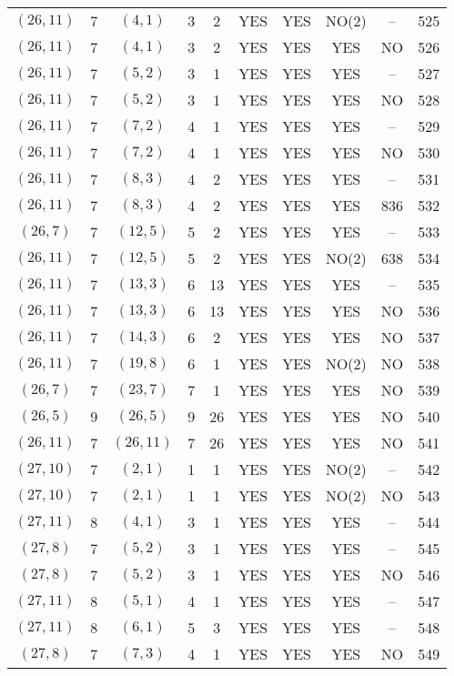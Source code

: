 \begin{longtable}{|c|c|c|c|c|c|c|c|c|c|}
$(26, 11)$ & 7 & $(4, 1)$ & 3 & 2 & YES & YES & NO(2) & -- & 525\\
$(26, 11)$ & 7 & $(4, 1)$ & 3 & 2 & YES & YES & YES & NO & 526\\
$(26, 11)$ & 7 & $(5, 2)$ & 3 & 1 & YES & YES & YES & -- & 527\\
$(26, 11)$ & 7 & $(5, 2)$ & 3 & 1 & YES & YES & YES & NO & 528\\
$(26, 11)$ & 7 & $(7, 2)$ & 4 & 1 & YES & YES & YES & -- & 529\\
$(26, 11)$ & 7 & $(7, 2)$ & 4 & 1 & YES & YES & YES & NO & 530\\
$(26, 11)$ & 7 & $(8, 3)$ & 4 & 2 & YES & YES & YES & -- & 531\\
$(26, 11)$ & 7 & $(8, 3)$ & 4 & 2 & YES & YES & YES & 836 & 532\\
$(26, 7)$ & 7 & $(12, 5)$ & 5 & 2 & YES & YES & YES & -- & 533\\
$(26, 11)$ & 7 & $(12, 5)$ & 5 & 2 & YES & YES & NO(2) & 638 & 534\\
$(26, 11)$ & 7 & $(13, 3)$ & 6 & 13 & YES & YES & YES & -- & 535\\
$(26, 11)$ & 7 & $(13, 3)$ & 6 & 13 & YES & YES & YES & NO & 536\\
$(26, 11)$ & 7 & $(14, 3)$ & 6 & 2 & YES & YES & YES & NO & 537\\
$(26, 11)$ & 7 & $(19, 8)$ & 6 & 1 & YES & YES & NO(2) & NO & 538\\
$(26, 7)$ & 7 & $(23, 7)$ & 7 & 1 & YES & YES & YES & NO & 539\\
$(26, 5)$ & 9 & $(26, 5)$ & 9 & 26 & YES & YES & YES & NO & 540\\
$(26, 11)$ & 7 & $(26, 11)$ & 7 & 26 & YES & YES & YES & NO & 541\\
$(27, 10)$ & 7 & $(2, 1)$ & 1 & 1 & YES & YES & NO(2) & -- & 542\\
$(27, 10)$ & 7 & $(2, 1)$ & 1 & 1 & YES & YES & NO(2) & NO & 543\\
$(27, 11)$ & 8 & $(4, 1)$ & 3 & 1 & YES & YES & YES & -- & 544\\
$(27, 8)$ & 7 & $(5, 2)$ & 3 & 1 & YES & YES & YES & -- & 545\\
$(27, 8)$ & 7 & $(5, 2)$ & 3 & 1 & YES & YES & YES & NO & 546\\
$(27, 11)$ & 8 & $(5, 1)$ & 4 & 1 & YES & YES & YES & -- & 547\\
$(27, 11)$ & 8 & $(6, 1)$ & 5 & 3 & YES & YES & YES & -- & 548\\
$(27, 8)$ & 7 & $(7, 3)$ & 4 & 1 & YES & YES & YES & NO & 549\\

\end{longtable}
